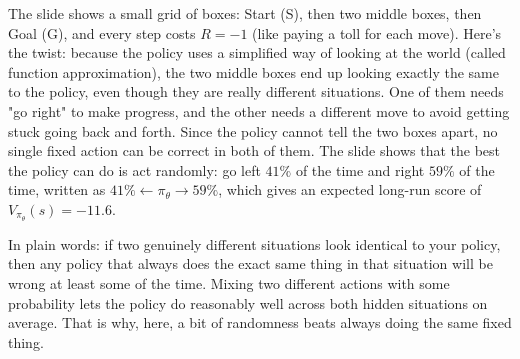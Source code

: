 \documentclass[11pt]{article}
\begin{document}
The slide shows a small grid of boxes: Start (S), then two middle boxes, then Goal (G), and every step costs $R=-1$ (like paying a toll for each move). Here's the twist: because the policy uses a simplified way of looking at the world (called function approximation), the two middle boxes end up looking exactly the same to the policy, even though they are really different situations. One of them needs "go right" to make progress, and the other needs a different move to avoid getting stuck going back and forth. Since the policy cannot tell the two boxes apart, no single fixed action can be correct in both of them. The slide shows that the best the policy can do is act randomly: go left $41\%$ of the time and right $59\%$ of the time, written as $41\% \leftarrow \pi_\theta \rightarrow 59\%$, which gives an expected long-run score of $V_{\pi_\theta}(s) = -11.6$.

In plain words: if two genuinely different situations look identical to your policy, then any policy that always does the exact same thing in that situation will be wrong at least some of the time. Mixing two different actions with some probability lets the policy do reasonably well across both hidden situations on average. That is why, here, a bit of randomness beats always doing the same fixed thing.
\end{document}
